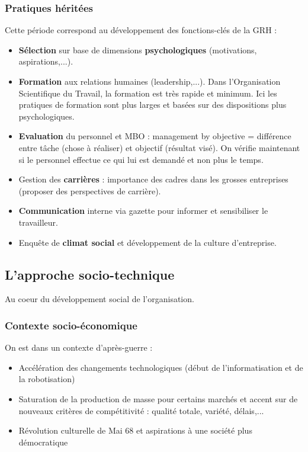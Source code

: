 \documentclass[12pt]{article}
\begin{document}
	  \subsubsection{Pratiques héritées}
	  
	  Cette période correspond au développement des fonctions-clés de la GRH :
	  
	  \begin{itemize}
	   \item \textbf{Sélection} sur base de dimensions \textbf{psychologiques} (motivations, aspirations,...).
	   \item \textbf{Formation} aux relations humaines (leadership,...). Dans l'Organisation Scientifique du Travail, la formation est très rapide et minimum. Ici les pratiques de formation sont plus larges et basées sur des dispositions plus psychologiques.
	   \item \textbf{Evaluation} du personnel et MBO : management by objective = différence entre tâche (chose à réaliser) et objectif (résultat visé). On vérifie maintenant si le personnel effectue ce qui lui est demandé et non plus le temps.
	   \item Gestion des \textbf{carrières} : importance des cadres dans les grosses entreprises (proposer des perspectives de carrière).
	   \item \textbf{Communication} interne via gazette pour informer et sensibiliser le travailleur.
	   \item Enquête de \textbf{climat social} et développement de la culture d'entreprise.
	  \end{itemize}
	  
	\subsection{L'approche socio-technique}
	Au coeur du développement social de l'organisation.
	
	\subsubsection{Contexte socio-économique}
	
	On est dans un contexte d'après-guerre :
	
	\begin{itemize}
	 \item Accélération des changements technologiques (début de l'informatisation et de la robotisation)
	 \item Saturation de la production de masse pour certains marchés et accent sur de nouveaux critères de compétitivité : qualité totale, variété, délais,...
	 \item Révolution culturelle de Mai 68 et aspirations à une société plus démocratique
	\end{itemize}
	
\end{document}
